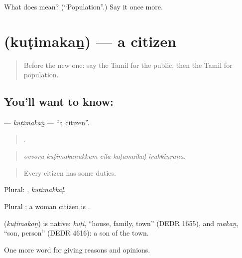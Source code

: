 \begin{tcolorbox}[breakable,colback=teal!4,colframe=teal!35!black,title={Before you move on}]
What does  mean? (\textquotedblleft{}Population\textquotedblright{}.) Say it once more.
\end{tcolorbox}
\section[\texorpdfstring{\ta{குடிமகன்} (kuṭimakaṉ)}{குடிமகன் (kuṭimakaṉ)}]{ (kuṭimakaṉ) — a citizen}

\label{lesson:TA-C369-kutimakan}



\begin{quote}
Before the new one: say the Tamil for the public, then the Tamil for population.
\end{quote}

\subsection*{You'll want to know: }
\textbf{} — \emph{kuṭimakaṉ} — \textquotedblleft{}a citizen\textquotedblright{}.

\begin{quote}
    .
\end{quote}

\begin{quote}
\emph{ovvoru kuṭimakaṉukkum cila kaṭamaikaḷ irukkiṉṟaṉa.}
\end{quote}

\begin{quote}
Every citizen has some duties.
\end{quote}

Plural: , \emph{kuṭimakkaḷ}.

Plural ; a woman citizen is .

\begin{cousinweb}
\textbf{} (\emph{kuṭimakaṉ}) is native: \emph{kuṭi}, \textquotedblleft{}house, family, town\textquotedblright{} (DEDR 1655), and \emph{makaṉ}, \textquotedblleft{}son, person\textquotedblright{} (DEDR 4616): a son of the town.
\end{cousinweb}

\begin{grammarlens}[title={What you've built}]
One more word for giving reasons and opinions.
\end{grammarlens}

